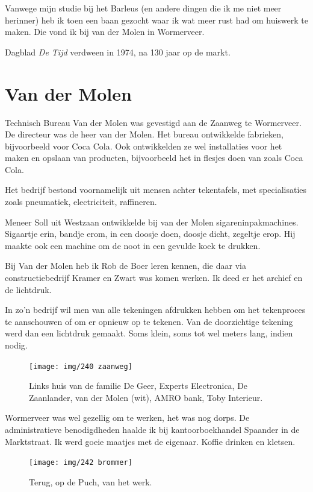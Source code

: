 \documentclass[10pt,twoside, openright]{memoir}
\begin{document}
Vanwege mijn studie bij het Barleus (en andere dingen die ik me niet meer herinner) heb ik toen een baan gezocht waar ik wat meer rust had om huiswerk te maken. Die vond ik bij van der Molen in Wormerveer.

Dagblad \emph{De Tijd} verdween in 1974, na 130 jaar op de markt.

\section{Van der Molen} %
\label{cha:vandermolen}

Technisch Bureau Van der Molen was gevestigd aan de Zaanweg te Wormerveer. De directeur was de heer van der Molen. Het bureau ontwikkelde fabrieken, bijvoorbeeld voor Coca Cola. Ook ontwikkelden ze wel installaties voor het maken en opslaan van producten, bijvoorbeeld het in flesjes doen van zoals Coca Cola. 

Het bedrijf bestond voornamelijk uit mensen achter tekentafels, met specialisaties zoals pneumatiek, electriciteit, raffineren.

Meneer Soll uit Westzaan ontwikkelde bij van der Molen  sigareninpakmachines. Sigaartje erin, bandje erom, in een doosje doen, doosje dicht, zegeltje erop. Hij maakte ook een machine om de noot in een gevulde koek te drukken. 

Bij Van der Molen heb ik Rob de Boer leren kennen, die daar via constructiebedrijf Kramer en Zwart was komen werken. Ik deed er het archief en de lichtdruk. 

In zo'n bedrijf wil men van alle tekeningen afdrukken hebben om het tekenproces te aanschouwen of om er opnieuw op te tekenen. Van de doorzichtige tekening werd dan een lichtdruk gemaakt. Soms klein, soms tot wel meters lang, indien nodig. 

\begin{figure}
\texttt{[image: img/240 zaanweg]}
\caption*{\footnotesize Links huis van de familie De Geer, Experts Electronica, De Zaanlander, van der Molen (wit), AMRO bank, Toby Interieur.}
\end{figure}

Wormerveer was wel gezellig om te werken, het was nog dorps. De administratieve benodigdheden haalde ik bij kantoorboekhandel Spaander in de Marktstraat. Ik werd goeie maatjes met de eigenaar. Koffie drinken en kletsen. 

\begin{figure}[t]
\texttt{[image: img/242 brommer]}
\caption*{\footnotesize Terug, op de Puch, van het werk.}
\end{figure}
\end{document}
